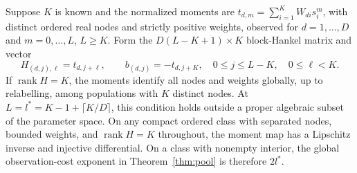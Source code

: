 \begin{proposition}\label{prop:poolcertificate}
Suppose $K$ is known and the normalized moments are $t_{d,m}=\sum_{i=1}^K W_{di}s_i^m$, with distinct ordered real nodes and strictly positive weights, observed for $d=1,\ldots,D$ and $m=0,\ldots,L$, $L\ge K$. Form the $D(L-K+1)\times K$ block-Hankel matrix and vector
\[
H_{(d,j),\ell}=t_{d,j+\ell},\qquad b_{(d,j)}=-t_{d,j+K},
\quad 0\le j\le L-K,\quad0\le\ell<K.
\]
If $\operatorname{rank}H=K$, the moments identify all nodes and weights globally, up to relabelling, among populations with $K$ distinct nodes. At $L=l^*=K-1+\lceil K/D\rceil$, this condition holds outside a proper algebraic subset of the parameter space. On any compact ordered class with separated nodes, bounded weights, and $\operatorname{rank}H=K$ throughout, the moment map has a Lipschitz inverse and injective differential. On a class with nonempty interior, the global observation-cost exponent in Theorem~\ref{thm:pool} is therefore $2l^*$.
\end{proposition}

